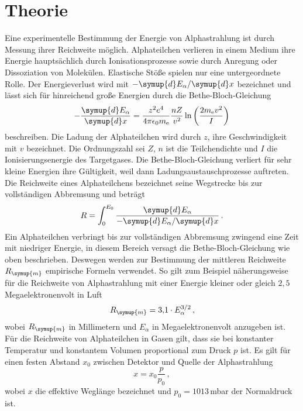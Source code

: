 \section{Theorie}
\label{sec:Theorie}
Eine experimentelle Bestimmung der Energie von Alphastrahlung ist durch Messung
ihrer Reichweite möglich. Alphateilchen verlieren in einem Medium ihre Energie
hauptsächlich durch Ionisationsprozesse sowie durch Anregung oder Dissoziation
von Molekülen. Elastische Stöße spielen nur eine untergeordnete Rolle. Der
Energieverlust wird mit $-\symup{d}E_\alpha / \symup{d}x$ bezeichnet und lässt sich
für hinreichend große Energien durch die Bethe-Bloch-Gleichung
\begin{equation}
  - \frac{\symup{d}E_\alpha}{\symup{d}x} = \frac{z^2 e^4}{4\pi \epsilon_0 m_\text{e}} \frac{n Z}{v^2} \ln{\left(\frac{2m_\text{e}v^2}{I}\right)}
  \label{eqn:bethebloch}
\end{equation}
beschreiben. Die Ladung der Alphateilchen wird durch $z$, ihre Geschwindigkeit mit $v$
bezeichnet. Die Ordnungszahl sei $Z$, $n$ ist die Teilchendichte und $I$ die Ionisierungsenergie
des Targetgases. Die Bethe-Bloch-Gleichung verliert für sehr kleine Energien ihre Gültigkeit,
weil dann Ladungsaustauschprozesse auftreten. \\
Die Reichweite eines Alphateilchens bezeichnet seine Wegstrecke bis zur vollständigen Abbremsung
und beträgt
\begin{equation}
  R = \int_0^{E_0} \frac{\symup{d}E_{\alpha}}{-\symup{d}E_{\alpha} / \symup{d}x}\,.
\end{equation}
Ein Alphateilchen verbringt bis zur vollständigen Abbremsung zwingend eine Zeit mit
niedriger Energie, in diesem Bereich versagt die Bethe-Bloch-Gleichung wie oben beschrieben.
Deswegen werden zur Bestimmung der mittleren Reichweite $R_{\symup{m}}$ empirische Formeln
verwendet. So gilt zum Beispiel näherungsweise für die Reichweite von Alphastrahlung mit einer
Energie kleiner oder gleich $2{,}5$ Megaelektronenvolt in Luft
\begin{equation}
  R_{\symup{m}} = 3{,}1 \cdot E_\alpha^{3/2}\,,
  \label{eqn:empirisch}
\end{equation}
wobei $R_{\symup{m}}$ in Millimetern und $E_\alpha$ in Megaelektronenvolt anzugeben ist.\\
Für die Reichweite von Alphateilchen in Gasen gilt, dass sie bei konstanter Temperatur
und konstantem Volumen proportional zum Druck $p$ ist. Es gilt für einen festen Abstand $x_0$
zwischen Detektor und Quelle der Alphastrahlung
\begin{equation}
  x = x_0 \frac{p}{p_0}\,,
  \label{eqn:eff_weg}
\end{equation}
wobei $x$ die effektive Weglänge bezeichnet und $p_0 = 1013$\,mbar der Normaldruck ist.
